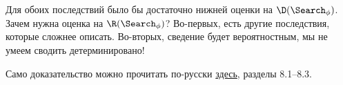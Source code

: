 Для обоих последствий было бы достаточно нижней оценки на $\D(\Search_\phi)$. Зачем нужна оценка на $\R(\Search_\phi)$? Во-первых, есть другие последствия, которые сложнее описать.  Во-вторых, сведение будет вероятностным, мы не умеем сводить детерминировано!

Само доказательство можно прочитать по-русски \href{https://www.dropbox.com/s/qfdeeaodzqofzpq/pc.pdf?dl=0#}{здесь}, разделы 8.1--8.3.

\begin{comment}
$f\colon \{0, 1\}^n\to A$
Для $z\in \{0, 1\}^n$ выделяем непересекающиеся блоки $\{B_i\}$ переменных $B_i\subseteq [n]$ со свойством: $f(z) \neq f(z^{B_i})$, где $z^{B_i}$ означает, что мы инвертируем все биты $z$ в позициях $B_i$.

Block sensitivity: $bs_z(f)$ "--- максимальное количество непересекающихся блоков с таким свойством.

Пусть теперь $S$ "--- отношение: $S\subseteq \{0, 1\}^n\times C$
Критическая точка $S$ "--- $x$ такой, что $\exists! c\colon (x,c)\in S$.

Пример. Пусть 3-КНФ формула невыполнима, рассмотрим случайную подстановку. В среднем у неё будет $\frac{1}{8}$ доля невыполненных клозов. То есть ответов для $\Search_\phi$ на случайном входе будет много, то есть случайный вход "--- не критическая точка.

Будем говорить, что функция $f\subseteq S$, если для каждого входа $x$ выбран какой-то один из подходящих ответов.
(Видимо, мы считаем, что отношение тотальное.)
(???)

Critical block sensitivity отношения $S$: $cbs(S) = \min_{f\subseteq S}\max_{x\text{ --- критический для }S} bs_x(f)$

Мы докажем, что существуют $\phi$ такие, что
$\R(\Search_\phi)\geqslant \Omega(\R(\UDISJ_{cbs(\Search_\phi))})\geqslant \Omega(cbs(\Search_\phi))$

Это не первая такая статья, были уже про функции и $bs$.
$cbs$ было определено в в [Huynh, Nordström; 2012], но они доказали напрямую без $\UDISJ$, доказательство через информационную сложность.
Мы рассмотрим доказательство через сведение, более простое.

Сначала построим формулы, для которых $cbs$ большое.
Цейтинские формулы.


\end{comment}

